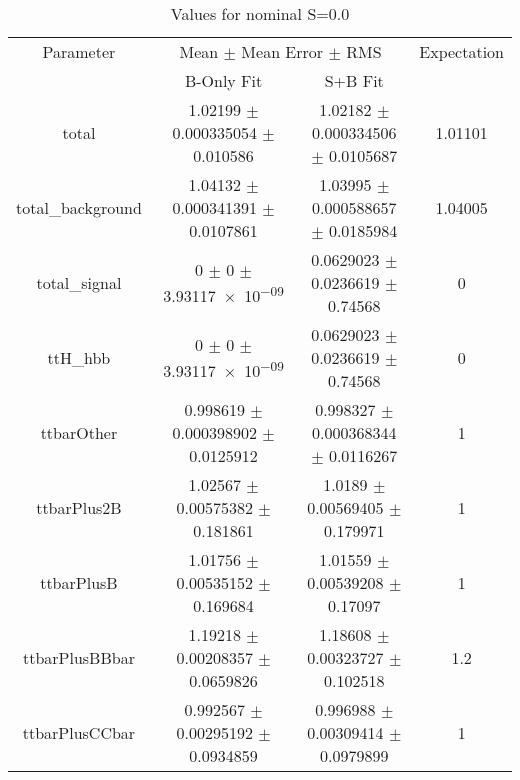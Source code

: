 \begin{table}
\centering
\caption{Values for nominal S=0.0}
\begin{tabular}{cccc}
\toprule
Parameter & \multicolumn{2}{c}{Mean $\pm$ Mean Error $\pm$ RMS} & Expectation\\
 & B-Only Fit & S+B Fit & \\
\midrule
total & \num{1.02199} $\pm$ \num{0.000335054} $\pm$ \num{0.010586} & \num{1.02182} $\pm$ \num{0.000334506} $\pm$ \num{0.0105687} & \num{1.01101}\\
total\_background & \num{1.04132} $\pm$ \num{0.000341391} $\pm$ \num{0.0107861} & \num{1.03995} $\pm$ \num{0.000588657} $\pm$ \num{0.0185984} & \num{1.04005}\\
total\_signal & \num{0} $\pm$ \num{0} $\pm$ \num{3.93117e-09} & \num{0.0629023} $\pm$ \num{0.0236619} $\pm$ \num{0.74568} & \num{0}\\
ttH\_hbb & \num{0} $\pm$ \num{0} $\pm$ \num{3.93117e-09} & \num{0.0629023} $\pm$ \num{0.0236619} $\pm$ \num{0.74568} & \num{0}\\
ttbarOther & \num{0.998619} $\pm$ \num{0.000398902} $\pm$ \num{0.0125912} & \num{0.998327} $\pm$ \num{0.000368344} $\pm$ \num{0.0116267} & \num{1}\\
ttbarPlus2B & \num{1.02567} $\pm$ \num{0.00575382} $\pm$ \num{0.181861} & \num{1.0189} $\pm$ \num{0.00569405} $\pm$ \num{0.179971} & \num{1}\\
ttbarPlusB & \num{1.01756} $\pm$ \num{0.00535152} $\pm$ \num{0.169684} & \num{1.01559} $\pm$ \num{0.00539208} $\pm$ \num{0.17097} & \num{1}\\
ttbarPlusBBbar & \num{1.19218} $\pm$ \num{0.00208357} $\pm$ \num{0.0659826} & \num{1.18608} $\pm$ \num{0.00323727} $\pm$ \num{0.102518} & \num{1.2}\\
ttbarPlusCCbar & \num{0.992567} $\pm$ \num{0.00295192} $\pm$ \num{0.0934859} & \num{0.996988} $\pm$ \num{0.00309414} $\pm$ \num{0.0979899} & \num{1}\\
\bottomrule
\end{tabular}
\end{table}
